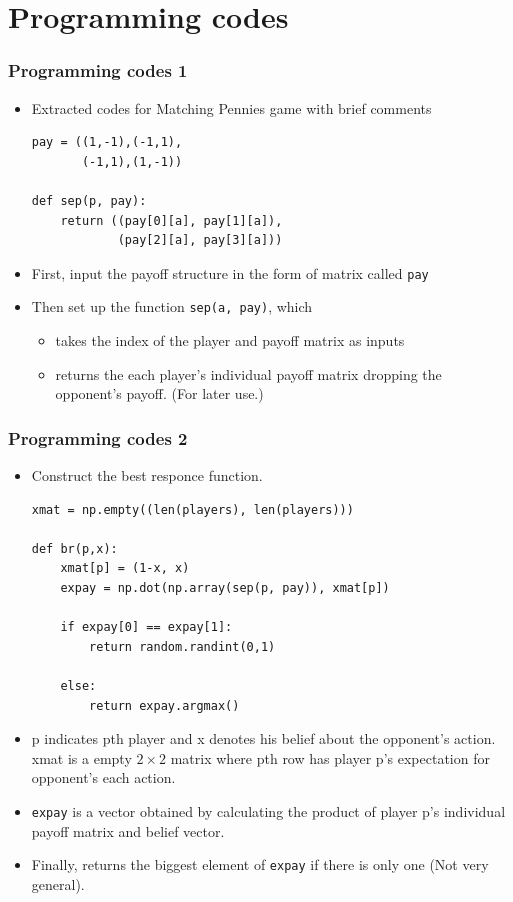 \documentclass[dvipdfmx,fleqn]{beamer}
\begin{document}
\section{Programming codes}
\begin{frame}[fragile]
\frametitle{Programming codes 1}
\begin{itemize}\setlength{\parskip}{0.5em}
\item
Extracted codes for Matching Pennies game with brief comments
\scriptsize
\begin{verbatim}
pay = ((1,-1),(-1,1),
       (-1,1),(1,-1)) 

def sep(p, pay):
    return ((pay[0][a], pay[1][a]),
            (pay[2][a], pay[3][a]))

\end{verbatim}
\normalsize

\item
First, input the payoff structure in the form of matrix called \texttt{pay}
\item
Then set up the function \texttt{sep(a, pay)}, which
 \begin{itemize}\setlength{\parskip}{0.5em}
 \item
 takes the index of the player and payoff matrix as inputs
 \item
 returns the each player's individual payoff matrix dropping the opponent's payoff. (For later use.)
 \end{itemize}

\end{itemize}
\end{frame}


\begin{frame}[fragile]
\frametitle{Programming codes 2}
\begin{itemize}\setlength{\parskip}{0.5em}
\item
Construct the best responce function.
\scriptsize
\begin{verbatim}
xmat = np.empty((len(players), len(players)))

def br(p,x):
    xmat[p] = (1-x, x)
    expay = np.dot(np.array(sep(p, pay)), xmat[p])

    if expay[0] == expay[1]:
        return random.randint(0,1)

    else:
        return expay.argmax()
\end{verbatim}
\normalsize

\item
p indicates pth player and x denotes his belief about the opponent's action. xmat is a empty $2\times2$ matrix where pth row  has player p's expectation for opponent's each action.

\item
\texttt{expay} is a vector obtained by calculating the product of player p's individual payoff matrix and belief vector.

\item
Finally, returns the biggest element of \texttt{expay} if there is only one (Not very general).
\end{itemize}
\end{frame}
\end{document}

